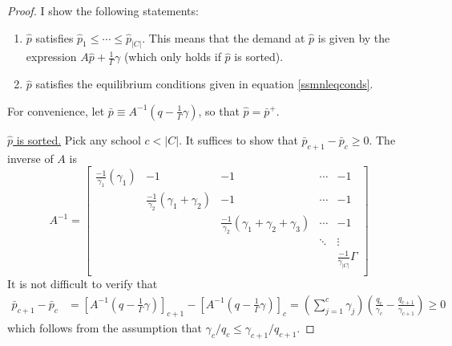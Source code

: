 \documentclass[12pt]{article}
\theoremstyle{definition}
\begin{document}
\begin{proof}
I show the following statements:
\begin{enumerate}
\item $\hat p$ satisfies $\hat p_1 \leq \cdots \leq \hat p_{|C|}$. This means that the demand at $\hat p$ is given by the expression $A \hat p + \frac{1}{\Gamma}\gamma$ (which only holds if $\hat p$ is sorted).
\item $\hat p$ satisfies the equilibrium conditions given in equation \eqref{ssmnleqconds}.
\end{enumerate}
For convenience, let $\bar p \equiv A^{-1} (q - \frac{1}{\Gamma} \gamma) $, so that $\hat p = \bar p^+$. 

\underline{$\hat p$ is sorted.} Pick any school $c < |C|$. It suffices to show that $\bar p_{c+1} - \bar p_{c} \geq 0$. The inverse of $A$ is
\begin{equation} \label{Ainv}
A^{-1} = \begin{bmatrix}
\frac{-1}{\gamma_1}\left( \gamma_1 \right) & -1 & -1 &\cdots & -1 \\
 & \frac{-1}{\gamma_2}\left( \gamma_1 + \gamma_2 \right) & -1 &\cdots & -1 \\
 & & \frac{-1}{\gamma_2}\left( \gamma_1 + \gamma_2 + \gamma_3 \right) &\cdots & -1 \\
 &  &  & \ddots & \vdots \\
 & & & &  \frac{-1}{\gamma_{|C|}} \Gamma \\
\end{bmatrix}
\end{equation}
It is not difficult to verify that
\begin{align} \label{barpissorted}
\bar p_{c+1} - \bar p_{c}
&= \left[A^{-1} (q - \frac{1}{\Gamma} \gamma) \right]_{c+1} - \left[A^{-1} (q - \frac{1}{\Gamma} \gamma) \right]_{c} = \left(\sum_{j=1}^c \gamma_j \right) \left(\frac{q_c}{\gamma_c} - \frac{q_{c+1}}{\gamma_{c+1}}\right) \geq 0
\end{align}
which follows from the assumption that $\gamma_c / q_c \leq \gamma_{c+1} / q_{c+1}$.



\end{proof}
\end{document}
